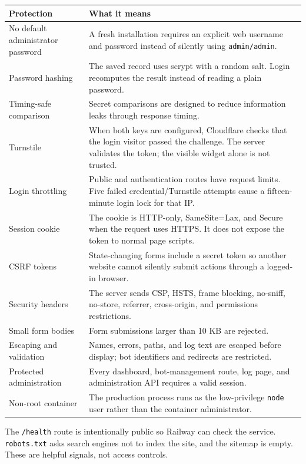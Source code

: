 \documentclass[11pt,a4paper]{article}
\begin{document}
\begin{longtable}{p{}p{}}
\toprule
\textbf{Protection} & \textbf{What it means}\\
\midrule
\endhead
No default administrator password & A fresh installation requires an explicit web username and password instead of silently using \texttt{admin/admin}.\\
Password hashing & The saved record uses scrypt with a random salt. Login recomputes the result instead of reading a plain password.\\
Timing-safe comparison & Secret comparisons are designed to reduce information leaks through response timing.\\
Turnstile & When both keys are configured, Cloudflare checks that the login visitor passed the challenge. The server validates the token; the visible widget alone is not trusted.\\
Login throttling & Public and authentication routes have request limits. Five failed credential/Turnstile attempts cause a fifteen-minute login lock for that IP.\\
Session cookie & The cookie is HTTP-only, SameSite=Lax, and Secure when the request uses HTTPS. It does not expose the token to normal page scripts.\\
CSRF tokens & State-changing forms include a secret token so another website cannot silently submit actions through a logged-in browser.\\
Security headers & The server sends CSP, HSTS, frame blocking, no-sniff, no-store, referrer, cross-origin, and permissions restrictions.\\
Small form bodies & Form submissions larger than 10 KB are rejected.\\
Escaping and validation & Names, errors, paths, and log text are escaped before display; bot identifiers and redirects are restricted.\\
Protected administration & Every dashboard, bot-management route, log page, and administration API requires a valid session.\\
Non-root container & The production process runs as the low-privilege \texttt{node} user rather than the container administrator.\\
\bottomrule
\end{longtable}

The \texttt{/health} route is intentionally public so Railway can check the service. \texttt{robots.txt} asks search engines not to index the site, and the sitemap is empty. These are helpful signals, not access controls.
\end{document}
